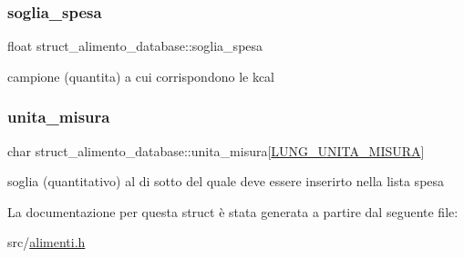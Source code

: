 \mbox{\label{structstruct__alimento__database_aee9bba41249ee895a0b32d20ebd9106b}} 
\subsubsection{\texorpdfstring{soglia\+\_\+spesa}{soglia\_spesa}}
{\footnotesize\ttfamily float struct\+\_\+alimento\+\_\+database\+::soglia\+\_\+spesa}



campione (quantita) a cui corrispondono le kcal 

\mbox{\label{structstruct__alimento__database_af52c21e8f55297532c22468e8f13415b}} 
\subsubsection{\texorpdfstring{unita\+\_\+misura}{unita\_misura}}
{\footnotesize\ttfamily char struct\+\_\+alimento\+\_\+database\+::unita\+\_\+misura\mbox{[}\hyperlink{alimenti_8h_ade0f1f034a3ec6c04b8e29f4730db983}{L\+U\+N\+G\+\_\+\+U\+N\+I\+T\+A\+\_\+\+M\+I\+S\+U\+RA}\mbox{]}}



soglia (quantitativo) al di sotto del quale deve essere inserirto nella lista spesa 



La documentazione per questa struct è stata generata a partire dal seguente file\+:\begin{DoxyCompactItemize}
\item 
src/\hyperlink{alimenti_8h}{alimenti.\+h}\end{DoxyCompactItemize}

